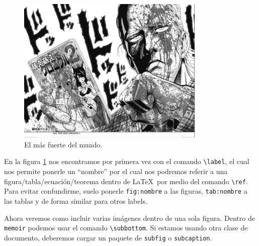 \documentclass[a4paper,article,oneside,11pt]{memoir}
\begin{document}
\begin{figure}[htp]
    \centering
    \includegraphics[width=0.8\textwidth]{images/king.png}
    \caption{El más fuerte del mundo.}
    \label{fig:king} 
\end{figure}

En la figura \ref{fig:king} nos encontramos por primera vez con el comando \verb|\label|, el cual nos permite ponerle un ``nombre'' por el cual nos podremos referir a una figura/tabla/ecuación/teorema dentro de \LaTeX\ por medio del comando \verb|\ref|. Para evitar confundirme, suelo ponerle \texttt{fig:nombre} a las figuras, \texttt{tab:nombre} a las tablas y de forma similar para otros labels.

Ahora veremos como incluir varias imágenes dentro de una sola figura. Dentro de \texttt{memoir} podemos usar el comando \verb|\subbottom|. Si estamos usando otra clase de documento, deberemos cargar un paquete de \texttt{subfig} o \texttt{subcaption}.
\end{document}
